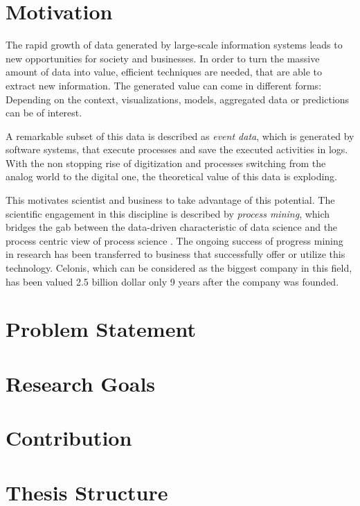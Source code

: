 


\section{Motivation}

The rapid growth of data generated by large-scale information systems leads to new opportunities for  society and businesses.
In order to turn the massive amount of data into value, efficient techniques are needed, that are able to extract new information.
The generated value can come in different forms: Depending on the context, visualizations, models, aggregated data or predictions can be of interest. 

A remarkable subset of this data is described as \textit{event data}, which is generated by software systems, that execute processes and save the executed activities in logs.
With the non stopping rise of digitization and processes switching from the analog world to the digital one, the theoretical value of this data is exploding.

This motivates scientist and business to take advantage of this potential.
The scientific engagement in this discipline is described by \textit{process mining}, which bridges the gab between the data-driven characteristic of data science and the process centric view of process science \cite{DBLP:books/sp/Aalst16}.
The ongoing success of progress mining in research has been transferred to business that successfully offer or utilize this technology.
Celonis, which can be considered as the biggest company in this field, has been valued 2.5 billion dollar only 9 years after the company was founded.



\section{Problem Statement}

\section{Research Goals}

\section{Contribution}

\section{Thesis Structure}